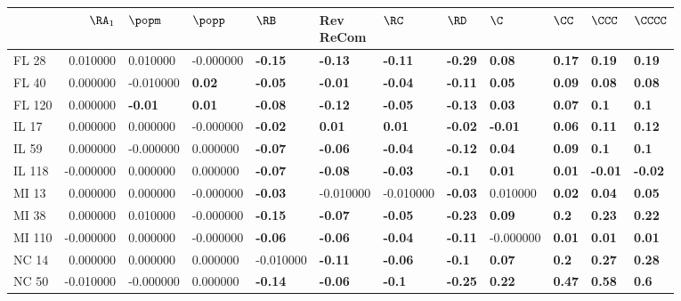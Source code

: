\begin{tabular}{lrllllllllll}
\toprule
 & $\RA_1$ & $\popm$ & $\popp$ & $\RB$ & \makecell{Rev \\ ReCom} & $\RC$ & $\RD$ & $\C$ & $\CC$ & $\CCC$ & $\CCCC$ \\
\midrule
FL 28 & 0.010000 & 0.010000 & -0.000000 & \textbf{-0.15} & \textbf{-0.13} & \textbf{-0.11} & \textbf{-0.29} & \textbf{0.08} & \textbf{0.17} & \textbf{0.19} & \textbf{0.19} \\
FL 40 & 0.000000 & -0.010000 & \textbf{0.02} & \textbf{-0.05} & \textbf{-0.01} & \textbf{-0.04} & \textbf{-0.11} & \textbf{0.05} & \textbf{0.09} & \textbf{0.08} & \textbf{0.08} \\
FL 120 & 0.000000 & \textbf{-0.01} & \textbf{0.01} & \textbf{-0.08} & \textbf{-0.12} & \textbf{-0.05} & \textbf{-0.13} & \textbf{0.03} & \textbf{0.07} & \textbf{0.1} & \textbf{0.1} \\
IL 17 & 0.000000 & 0.000000 & -0.000000 & \textbf{-0.02} & \textbf{0.01} & \textbf{0.01} & \textbf{-0.02} & \textbf{-0.01} & \textbf{0.06} & \textbf{0.11} & \textbf{0.12} \\
IL 59 & 0.000000 & -0.000000 & 0.000000 & \textbf{-0.07} & \textbf{-0.06} & \textbf{-0.04} & \textbf{-0.12} & \textbf{0.04} & \textbf{0.09} & \textbf{0.1} & \textbf{0.1} \\
IL 118 & -0.000000 & 0.000000 & 0.000000 & \textbf{-0.07} & \textbf{-0.08} & \textbf{-0.03} & \textbf{-0.1} & \textbf{0.01} & \textbf{0.01} & \textbf{-0.01} & \textbf{-0.02} \\
MI 13 & 0.000000 & 0.000000 & -0.000000 & \textbf{-0.03} & -0.010000 & -0.010000 & \textbf{-0.03} & 0.010000 & \textbf{0.02} & \textbf{0.04} & \textbf{0.05} \\
MI 38 & 0.000000 & 0.010000 & -0.000000 & \textbf{-0.15} & \textbf{-0.07} & \textbf{-0.05} & \textbf{-0.23} & \textbf{0.09} & \textbf{0.2} & \textbf{0.23} & \textbf{0.22} \\
MI 110 & -0.000000 & 0.000000 & -0.000000 & \textbf{-0.06} & \textbf{-0.06} & \textbf{-0.04} & \textbf{-0.11} & -0.000000 & \textbf{0.01} & \textbf{0.01} & \textbf{0.01} \\
NC 14 & 0.000000 & 0.000000 & 0.000000 & -0.010000 & \textbf{-0.11} & \textbf{-0.06} & \textbf{-0.1} & \textbf{0.07} & \textbf{0.2} & \textbf{0.27} & \textbf{0.28} \\
NC 50 & -0.010000 & -0.000000 & 0.000000 & \textbf{-0.14} & \textbf{-0.06} & \textbf{-0.1} & \textbf{-0.25} & \textbf{0.22} & \textbf{0.47} & \textbf{0.58} & \textbf{0.6} \\

\end{tabular}
